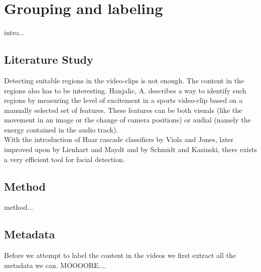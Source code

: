 %
\section{Grouping and labeling}
%
intro...
%
\subsection{Literature Study}
%
Detecting suitable regions in the video-clips is not enough. The content in the regions also has to be interesting. Hanjalic, A. \cite{citeulike:405480} describes a way to identify such regions by measuring the level of excitement in a sports video-clip based on a manually selected set of features. These features can be both visuals (like the movement in an image or the change of camera positions) or audial (namely the energy contained in the audio track).%
\\
%
With the introduction of Haar cascade classifiers by Viola and Jones\cite{viola01}, later improved upon by Lienhart and Maydt\cite{lienhart01} and by Schmidt and Kasinski\cite{schmidt01}\cite{schmidt02}, there exists a very efficient tool for facial detection.
%
\subsection{Method}
%
method...
%
\subsection{Metadata}
%
Before we attempt to label the content in the videos we first extract all the metadata we can. MOOOORE....
%
